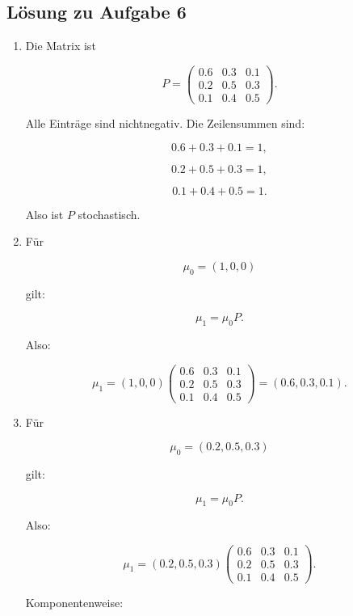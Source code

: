 \documentclass[11pt,a4paper]{article}
\begin{document}
\subsection*{Lösung zu Aufgabe 6}

\begin{enumerate}
    \item Die Matrix ist

    \[
    P =
    \begin{pmatrix}
    0.6 & 0.3 & 0.1 \\
    0.2 & 0.5 & 0.3 \\
    0.1 & 0.4 & 0.5
    \end{pmatrix}.
    \]

    Alle Einträge sind nichtnegativ. Die Zeilensummen sind:

    \[
    0.6+0.3+0.1=1,
    \]

    \[
    0.2+0.5+0.3=1,
    \]

    \[
    0.1+0.4+0.5=1.
    \]

    Also ist $P$ stochastisch.

    \item Für

    \[
    \mu_0=(1,0,0)
    \]

    gilt:

    \[
    \mu_1=\mu_0P.
    \]

    Also:

    \[
    \mu_1
    =
    (1,0,0)
    \begin{pmatrix}
    0.6 & 0.3 & 0.1 \\
    0.2 & 0.5 & 0.3 \\
    0.1 & 0.4 & 0.5
    \end{pmatrix}
    =
    (0.6,0.3,0.1).
    \]

    \item Für

    \[
    \mu_0=(0.2,0.5,0.3)
    \]

    gilt:

    \[
    \mu_1=\mu_0P.
    \]

    Also:

    \[
    \mu_1
    =
    (0.2,0.5,0.3)
    \begin{pmatrix}
    0.6 & 0.3 & 0.1 \\
    0.2 & 0.5 & 0.3 \\
    0.1 & 0.4 & 0.5
    \end{pmatrix}.
    \]

    Komponentenweise:


\end{enumerate}
\end{document}
